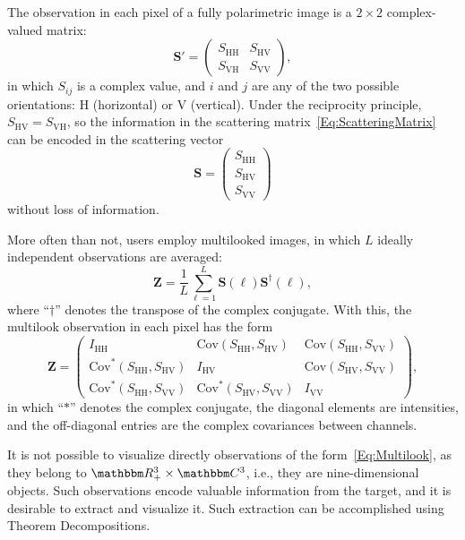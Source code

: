 \documentclass{article}
\begin{document}
The observation in each pixel of a fully polarimetric image is a $2\times2$ complex-valued matrix:
\begin{equation}
\bm S' = \begin{pmatrix}
   	S_{\text{HH}} & S_{\text{HV}}\\
   	S_{\text{VH}} & S_{\text{VV}}
\end{pmatrix}, \label{Eq:ScatteringMatrix}
\end{equation}
in which $S_{ij}$ is a complex value, and $i$ and $j$ are any of the two possible orientations: $\text{H}$ (horizontal) or $\text{V}$ (vertical).
Under the reciprocity principle, $S_{\text{HV}}=S_{\text{VH}}$, so the information in the scattering matrix~\eqref{Eq:ScatteringMatrix} can be encoded in the scattering vector
\begin{equation}
\bm S = \begin{pmatrix}
   	S_{\text{HH}}\\
   	S_{\text{HV}}\\
   	S_{\text{VV}}
\end{pmatrix}
\end{equation}
without loss of information.

More often than not, users employ multilooked images, in which $L$ ideally independent observations are averaged:
\begin{equation}
\bm Z = \frac{1}{L} \sum_{\ell=1}^L \bm S(\ell) \bm S^\dag(\ell),
\end{equation}
where ``$\dag$'' denotes the transpose of the complex conjugate.
With this, the multilook observation in each pixel has the form
\begin{equation}
\bm Z = \begin{pmatrix}
I_{\text{HH}} & \text{Cov}(S_{\text{HH}},S_\text{HV}) & \text{Cov}(S_{\text{HH}},S_\text{VV}) \\
\text{Cov}^*(S_{\text{HH}},S_\text{HV}) & I_{\text{HV}} & \text{Cov}(S_{\text{HV}},S_\text{VV})\\
\text{Cov}^*(S_{\text{HH}},S_\text{VV}) & \text{Cov}^*(S_{\text{HV}},S_\text{VV}) & I_{\text{VV}}
\end{pmatrix},
\label{Eq:Multilook}
\end{equation}
in which ``$*$'' denotes the complex conjugate, the diagonal elements are intensities, and the off-diagonal entries are the complex covariances between channels.

It is not possible to visualize directly observations of the form~\eqref{Eq:Multilook}, as they belong to $\mathbbm R_+^3\times \mathbbm C^3$, i.e., they are nine-dimensional objects.
Such observations encode valuable information from the target, and it is desirable to extract and visualize it.
Such extraction can be accomplished using Theorem Decompositions.
\end{document}

